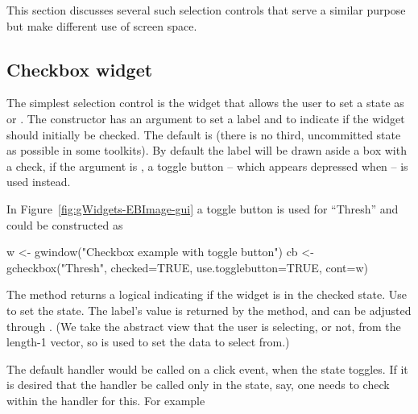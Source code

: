 This section discusses several such selection controls that serve a
similar purpose but make different use of screen space.

\subsection{Checkbox widget}
\label{sec:gWidgets-checkbox-widget}

The simplest selection control is the  widget
that allows the user to set a state as  or
. The constructor has an argument
 to set a label and
 to indicate if the widget should
initially be checked. The default is  (there is no third,
uncommitted state as possible in some toolkits). By default the label
will be drawn aside a box with a check, if the argument
 is , a toggle button
-- which appears depressed when  -- is used instead.

In Figure~\ref{fig:gWidgets-EBImage-gui} a toggle button is used for
``Thresh''  and could be constructed as

\begin{Schunk}
\begin{Sinput}
 w <- gwindow("Checkbox example with toggle button")
 cb <- gcheckbox("Thresh", checked=TRUE, use.togglebutton=TRUE,
                 cont=w)
\end{Sinput}
\end{Schunk}

The  method returns a logical indicating if
the widget is in the checked state. Use  to set
the state. The label's value is returned by the
\method{[}{gcheckbox} method, and can be adjusted through 
\method{[\ASSIGN}{gcheckbox}. (We take the abstract view that the user
is selecting, or not, from the length-1 vector, so \meth{[} is used to
set the data to select from.)

The default handler would be called on a click event, when the state toggles. If it is desired
that the handler be called only in the  state, say, one
needs to check within the handler for this. For example
\begin{Schunk}
\end{Schunk}

